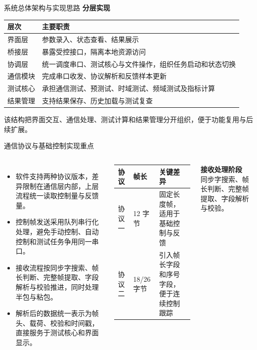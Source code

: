 \documentclass[11pt,aspectratio=169]{beamer}
\begin{document}
\begin{frame}{系统总体架构与实现思路}
  \small
  \textbf{分层实现}

  \vspace{0.3em}
  \begin{tabular}{@{}p{}p{}@{}}
    \toprule
    层次 & 主要职责 \\
    \midrule
    界面层 & 参数录入、状态查看、结果展示 \\
    桥接层 & 暴露受控接口，隔离本地资源访问 \\
    协调层 & 统一调度串口、测试核心与文件操作，组织任务启动和状态切换 \\
    通信模块 & 完成串口收发、协议解析和反馈样本更新 \\
    测试核心 & 承担通信测试、预测试、时域测试、频域测试及指标计算 \\
    结果管理 & 支持结果保存、历史加载与测试复查 \\
    \bottomrule
  \end{tabular}

  \vspace{0.5em}
  \small
  该结构把界面交互、通信处理、测试计算和结果管理分开组织，便于功能复用与后续扩展。
\end{frame}

\begin{frame}{通信协议与基础控制实现重点}
  \begin{columns}[T,onlytextwidth]
    \small
    \begin{itemize}
      \item 软件支持两种协议版本，差异限制在通信层内部，上层流程统一读取控制量与反馈量。
      \item 控制帧发送采用队列串行化处理，避免手动控制、自动控制和测试任务争用同一串口。
      \item 接收流程按同步字搜索、帧长判断、完整帧提取、字段解析与校验推进，同时处理半包与粘包。
      \item 解析后的数据统一表示为帧头、载荷、校验和时间戳，直接服务于测试核心和界面显示。
    \end{itemize}

    \footnotesize
    \begin{tabular}{@{}p{}p{}p{}@{}}
      \toprule
      协议 & 帧长 & 关键差异 \\
      \midrule
      协议一 & 12 字节 & 固定长度帧，适用于基础控制与反馈 \\
      协议二 & 18/26 字节 & 引入帧长字段和序号字段，便于连续控制跟踪 \\
      \bottomrule
    \end{tabular}

    \vspace{0.9em}
    \small
    \textbf{接收处理阶段}\\
    同步字搜索、帧长判断、完整帧提取、字段解析与校验。
  \end{columns}
\end{frame}
\end{document}

